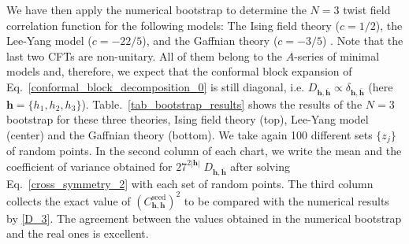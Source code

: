 \documentclass[a4paper,11pt]{article}
\begin{document}
We have  then apply the numerical bootstrap to determine the $N=3$ twist field correlation function for the following  models: The Ising field theory ($c=1/2$), the  Lee-Yang model ($c=-22/5$), 
and the Gaffnian theory ($c=-3/5$) \cite{Simon,Ardonne}. Note that the last two CFTs are non-unitary. All of them 
belong to the $A$-series of minimal models and, therefore, we expect that the conformal block expansion of Eq.~\eqref{conformal_block_decomposition_0} is still diagonal, i.e. $D_{\boldsymbol{h}, \boldsymbol{\bar{h}}}\propto \delta_{\boldsymbol{h}, \boldsymbol{\bar{h}}}$ (here $\boldsymbol{h}=\{h_1, h_2, h_3\}$). 
Table.~\ref{tab_bootstrap_results} shows the results of the $N=3$ bootstrap for these three
theories, Ising field theory (top), Lee-Yang model (center) and the Gaffnian theory (bottom). 
We take again 100 different sets $\{z_j\}$ of random points. In the second column of each chart, we write 
the mean and the coefficient of variance obtained for  
$27^{2|\boldsymbol{h}|}\;D_{\boldsymbol{h}, \boldsymbol{\bar{h}}}$  after solving 
Eq.~\eqref{cross_symmetry_2} with each set of random points. The third column collects 
the exact value of  $(C^{\text{seed}}_{\boldsymbol{h},\boldsymbol{h}})^2$ to be compared with the numerical results by \eqref{D_3}. The agreement between the 
values obtained in the numerical bootstrap and the real ones is excellent. 
\end{document}
